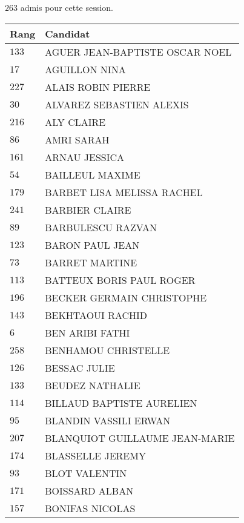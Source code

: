 



  $263$ admis pour cette session.

  \begin{xltabular}{\linewidth}{|l|X|}
    \hline
    \textbf{Rang} & \textbf{Candidat} \\
    \hline
    $133$ & AGUER JEAN-BAPTISTE OSCAR NOEL \\
    \hline
    $17$ & AGUILLON NINA \\
    \hline
    $227$ & ALAIS ROBIN PIERRE \\
    \hline
    $30$ & ALVAREZ SEBASTIEN ALEXIS \\
    \hline
    $216$ & ALY CLAIRE \\
    \hline
    $86$ & AMRI SARAH \\
    \hline
    $161$ & ARNAU JESSICA \\
    \hline
    $54$ & BAILLEUL MAXIME \\
    \hline
    $179$ & BARBET LISA MELISSA RACHEL \\
    \hline
    $241$ & BARBIER CLAIRE \\
    \hline
    $89$ & BARBULESCU RAZVAN \\
    \hline
    $123$ & BARON PAUL JEAN \\
    \hline
    $73$ & BARRET MARTINE \\
    \hline
    $113$ & BATTEUX BORIS PAUL ROGER \\
    \hline
    $196$ & BECKER GERMAIN CHRISTOPHE \\
    \hline
    $143$ & BEKHTAOUI RACHID \\
    \hline
    $6$ & BEN ARIBI FATHI \\
    \hline
    $258$ & BENHAMOU CHRISTELLE \\
    \hline
    $126$ & BESSAC JULIE \\
    \hline
    $133$ & BEUDEZ NATHALIE \\
    \hline
    $114$ & BILLAUD BAPTISTE AURELIEN \\
    \hline
    $95$ & BLANDIN VASSILI ERWAN \\
    \hline
    $207$ & BLANQUIOT GUILLAUME JEAN-MARIE \\
    \hline
    $174$ & BLASSELLE JEREMY \\
    \hline
    $93$ & BLOT VALENTIN \\
    \hline
    $171$ & BOISSARD ALBAN \\
    \hline
    $157$ & BONIFAS NICOLAS \\

\end{xltabular}
